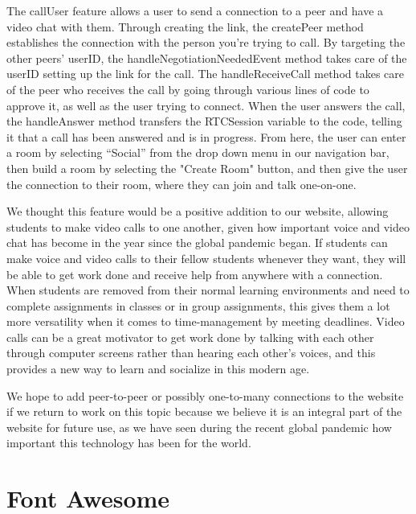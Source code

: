 The callUser feature allows a user to send a connection to a peer and have a video chat with them. Through creating the link, the createPeer method establishes the connection with the person you're trying to call. By targeting the other peers' userID, the handleNegotiationNeededEvent method takes care of the userID setting up the link for the call. The handleReceiveCall method takes care of the peer who receives the call by going through various lines of code to approve it, as well as the user trying to connect. When the user answers the call, the handleAnswer method transfers the RTCSession variable to the code, telling it that a call has been answered and is in progress. From here, the user can enter a room by selecting “Social” from the drop down menu in our navigation bar, then build a room by selecting the "Create Room" button, and then give the user the connection to their room, where they can join and talk one-on-one.\hfill \break

We thought this feature would be a positive addition to our website, allowing students to make video calls to one another, given how important voice and video chat has become in the year since the global pandemic began. If students can make voice and video calls to their fellow students whenever they want, they will be able to get work done and receive help from anywhere with a connection. When students are removed from their normal learning environments and need to complete assignments in classes or in group assignments, this gives them a lot more versatility when it comes to time-management by meeting deadlines. Video calls can be a great motivator to get work done by talking with each other through computer screens rather than hearing each other's voices, and this provides a new way to learn and socialize in this modern age.\hfill \break

We hope to add peer-to-peer or possibly one-to-many connections to the website if we return to work on this topic because we believe it is an integral part of the website for future use, as we have seen during the recent global pandemic how important this technology has been for the world.


\section{Font Awesome}

